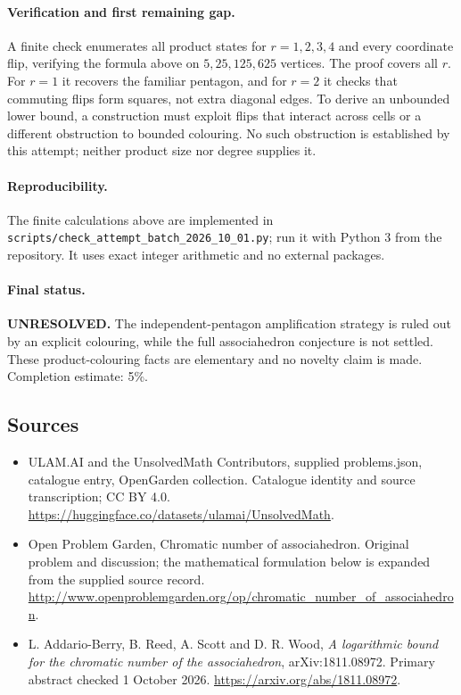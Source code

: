 \documentclass[11pt,a4paper]{article}
\begin{document}
\paragraph{Verification and first remaining gap.}
A finite check enumerates all product states for $r=1,2,3,4$ and every
coordinate flip, verifying the formula above on $5,25,125,625$ vertices.
The proof covers all $r$. For $r=1$ it recovers the familiar pentagon, and
for $r=2$ it checks that commuting flips form squares, not extra diagonal
edges. To derive an unbounded lower bound, a construction must exploit flips
that interact across cells or a different obstruction to bounded colouring.
No such obstruction is established by this attempt; neither product size nor
degree supplies it.

\paragraph{Reproducibility.}
The finite calculations above are implemented in
\texttt{scripts/check\_attempt\_batch\_2026\_10\_01.py}; run it with Python 3
from the repository. It uses exact integer arithmetic and no external packages.

\paragraph{Final status.}
\textbf{UNRESOLVED.} The independent-pentagon amplification strategy is ruled
out by an explicit colouring, while the full associahedron conjecture is not
settled. These product-colouring facts are elementary and no novelty claim
is made. Completion estimate: 5\%.

\subsection{Sources}
\begin{itemize}
\item[S1] ULAM.AI and the UnsolvedMath Contributors, supplied problems.json, catalogue entry, OpenGarden collection. Catalogue identity and source transcription; CC BY 4.0.
\url{https://huggingface.co/datasets/ulamai/UnsolvedMath}.
\item[S2] Open Problem Garden, Chromatic number of associahedron. Original problem and discussion; the mathematical formulation below is expanded from the supplied source record.
\url{http://www.openproblemgarden.org/op/chromatic_number_of_associahedron}.
\item[A1] L. Addario-Berry, B. Reed, A. Scott and D. R. Wood, \emph{A logarithmic bound for the chromatic number of the associahedron}, arXiv:1811.08972. Primary abstract checked 1 October 2026. \url{https://arxiv.org/abs/1811.08972}.
\end{itemize}
\end{document}
